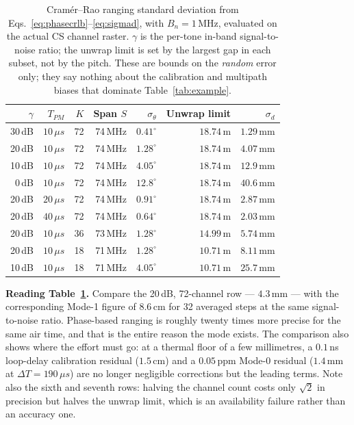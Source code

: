 \documentclass[11pt,a4paper]{article}
\newcommand{\us}{\,\ensuremath{\upmu}s}
\newcommand{\Tpm}{T_{PM}}
\providecommand{\upmu}{\mu}
\begin{document}
\begin{table}[h]
\caption{Cram\'er--Rao ranging standard deviation from Eqs.~\eqref{eq:phasecrlb}--\eqref{eq:sigmad},
with $B_n = 1$\,MHz, evaluated on the actual CS channel raster. $\gamma$ is the per-tone in-band
signal-to-noise ratio; the unwrap limit is set by the largest gap in each subset, not by the pitch. These are bounds on the
\emph{random} error only; they say nothing about the calibration and multipath biases that dominate
Table~\ref{tab:example}.}
\label{tab:crlb}
\centering\small
\begin{tabular}{@{}rrrrrrr@{}}
\toprule
$\gamma$ & $\Tpm$ & $K$ & Span $S$ & $\sigma_\theta$ & Unwrap limit & $\sigma_d$ \\
\midrule
30\,dB & $10\us$ & 72 & 74\,MHz & $0.41^{\circ}$ & $18.74$\,m & $1.29$\,mm \\
20\,dB & $10\us$ & 72 & 74\,MHz & $1.28^{\circ}$ & $18.74$\,m & $4.07$\,mm \\
10\,dB & $10\us$ & 72 & 74\,MHz & $4.05^{\circ}$ & $18.74$\,m & $12.9$\,mm \\
 0\,dB & $10\us$ & 72 & 74\,MHz & $12.8^{\circ}$ & $18.74$\,m & $40.6$\,mm \\
20\,dB & $20\us$ & 72 & 74\,MHz & $0.91^{\circ}$ & $18.74$\,m & $2.87$\,mm \\
20\,dB & $40\us$ & 72 & 74\,MHz & $0.64^{\circ}$ & $18.74$\,m & $2.03$\,mm \\
20\,dB & $10\us$ & 36 & 73\,MHz & $1.28^{\circ}$ & $14.99$\,m & $5.74$\,mm \\
20\,dB & $10\us$ & 18 & 71\,MHz & $1.28^{\circ}$ & $10.71$\,m & $8.11$\,mm \\
10\,dB & $10\us$ & 18 & 71\,MHz & $4.05^{\circ}$ & $10.71$\,m & $25.7$\,mm \\
\bottomrule
\end{tabular}
\end{table}

\begin{callout}
\textbf{Reading Table~\ref{tab:crlb}.} Compare the 20\,dB, 72-channel row --- $4.3$\,mm --- with the
corresponding Mode-1 figure of $8.6$\,cm for 32 averaged steps at the same signal-to-noise ratio.
Phase-based ranging is roughly twenty times more precise for the same air time, and that is the
entire reason the mode exists. The comparison also shows where the effort must go: at a thermal floor
of a few millimetres, a $0.1$\,ns loop-delay calibration residual ($1.5$\,cm) and a $0.05$\,ppm
Mode-0 residual ($1.4$\,mm at $\Delta T = 190\us$) are no longer negligible corrections but the
leading terms. Note also the sixth and seventh rows: halving the channel count costs only
$\sqrt{2}$ in precision but halves the unwrap limit, which is an availability failure rather than an
accuracy one.
\end{callout}
\end{document}
